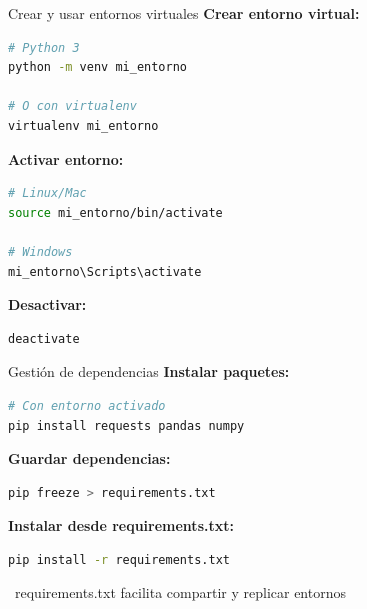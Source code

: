 \documentclass{beamer}
\begin{document}
\begin{frame}[fragile]{Crear y usar entornos virtuales \faTerminal}
\textbf{Crear entorno virtual:}
\begin{lstlisting}[language=bash, numbers=none]
# Python 3
python -m venv mi_entorno

# O con virtualenv
virtualenv mi_entorno
\end{lstlisting}

\vspace{0.2cm}
\textbf{Activar entorno:}
\begin{lstlisting}[language=bash, numbers=none]
# Linux/Mac
source mi_entorno/bin/activate

# Windows
mi_entorno\Scripts\activate
\end{lstlisting}

\vspace{0.2cm}
\textbf{Desactivar:}
\begin{lstlisting}[language=bash, numbers=none]
deactivate
\end{lstlisting}
\end{frame}

\begin{frame}[fragile]{Gestión de dependencias \faListAlt}
\textbf{Instalar paquetes:}
\begin{lstlisting}[language=bash, numbers=none]
# Con entorno activado
pip install requests pandas numpy
\end{lstlisting}

\vspace{0.2cm}
\textbf{Guardar dependencias:}
\begin{lstlisting}[language=bash, numbers=none]
pip freeze > requirements.txt
\end{lstlisting}

\vspace{0.2cm}
\textbf{Instalar desde requirements.txt:}
\begin{lstlisting}[language=bash, numbers=none]
pip install -r requirements.txt
\end{lstlisting}

\vspace{0.2cm}
\begin{notebox}
\small\faLightbulb\ requirements.txt facilita compartir y replicar entornos
\end{notebox}
\end{frame}
\end{document}
